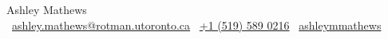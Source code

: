 
\begin{center}
    {\huge Ashley Mathews} \\[0.6em]
    {\color{airforceblue}
        \faEnvelope\ \href{mailto:ashley.mathews@rotman.utoronto.ca}{ashley.mathews@rotman.utoronto.ca}
        \hspace{1.5em}
        \faPhone\ \href{tel:+15195890216}{+1 (519) 589 0216}
        \hspace{1.5em}
        \faLinkedin\ \href{https://www.linkedin.com/in/ashleymmathews}{ashleymmathews}
    }
    \vspace{-7pt}
\end{center}
\vspace{-0.42em}